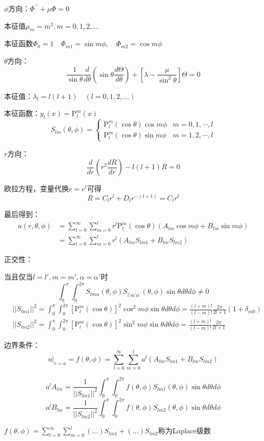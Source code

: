\noindent $\phi$方向：$\Phi^{\prime\prime}+\mu\Phi=0$

本征值$\mu_m=m^2,m=0,1,2,\dots$

本征函数$\Phi_0=1\quad\Phi_{m1}=\sin m\phi,\quad\Phi_{m2}=\cos m\phi$

\noindent $\theta$方向：
$$
\frac{1}{\sin\theta}\frac{d}{d\theta}\left(\sin\theta\frac{d\Theta}{d\theta}\right)+\left[\lambda-\frac{\mu}{\sin^2\theta}\right]\Theta=0
$$

本征值：$\lambda_l=l(l+1)\quad(l=0,1,2,...)$

本征函数：$y_l(x)=\mathrm{P}_l^m(x)$
$$S_{lm}(\theta,\phi)=
\begin{cases}
    \mathrm{P}_l^m(\cos\theta)\cos m\phi&m=0,1,\cdots,l\\
    \mathrm{P}_l^m(\cos\theta)\sin m\phi&m=1,2,\cdots,l
\end{cases}$$

\noindent $r$方向：
$$\frac{d}{dr}(r^{2}\frac{dR}{dr})-l(l+1)R=0$$

欧拉方程，变量代换$r=e^t$可得
$$R=C_{l}r^{l}+D_lr^{-(l+1)}=C_{l}r^{l}$$

\noindent 最后得到：
$$\begin{aligned}
    u(r,\theta,\phi)
    &=\boxed{\sum_{l=0}^{\infty}\sum_{m=0}^{l}r^{l}\mathrm{P}_{l}^{m}(\cos\theta)(A_{lm}\cos m\phi+B_{lm}\sin m\phi)}\\
    &=\sum_{l=0}^{\infty}\sum_{m=0}^{l}r^{l}(A_{lm}S_{lm1}+B_{lm}S_{lm2})
\end{aligned}$$

\noindent 正交性：

当且仅当$l=l',m=m',\alpha=\alpha'$时
$$\int_{0}^{\pi}\int_{0}^{2\pi}S_{lm\alpha}(\theta,\phi)S_{l^{\prime}m^{\prime}\alpha^{\prime}}(\theta,\phi)\sin\theta d\theta d\phi\neq0$$
$$\begin{aligned}
    &||S_{lm1}||^{2}=\int_{0}^{\pi}\int_{0}^{2\pi}[\mathrm{P}_{l}^{m}(\cos\theta)]^{2}\cos^{2}m\phi\sin\theta d\theta d\phi=\frac{(l+m)!}{(l-m)!}\frac{2\pi}{2l+1}(1+\delta_{m0})\\
    &||S_{lm2}||^{2}=\int_{0}^{\pi}\int_{0}^{2\pi}[\mathrm{P}_{l}^{m}(\cos\theta)]^{2}\sin^{2}m\phi\sin\theta d\theta d\phi=\frac{(l+m)!}{(l-m)!}\frac{2\pi}{2l+1}
\end{aligned}$$

\noindent 边界条件：
$$u|_{r=a}=f(\theta,\phi)=\sum_{l=0}^{\infty}\sum_{m=0}^{l}a^{l}(A_{lm}S_{lm1}+B_{lm}S_{lm2})$$

$$a^{l}A_{lm}=\frac{1}{||S_{lm1}||^{2}}\int_{0}^{\pi}\int_{0}^{2\pi}f(\theta,\phi)S_{lm1}(\theta,\phi)\sin\theta d\theta d\phi $$
$$a^{l}B_{lm}=\frac{1}{||S_{lm2}||^{2}}\int_{0}^{\pi}\int_{0}^{2\pi}f(\theta,\phi)S_{lm2}(\theta,\phi)\sin\theta d\theta d\phi $$

$f(\theta,\phi)=\sum_{l=0}^{\infty}\sum_{m=0}^{l}(\dots)S_{lm1}+(\dots)S_{lm2}$称为Laplace级数
